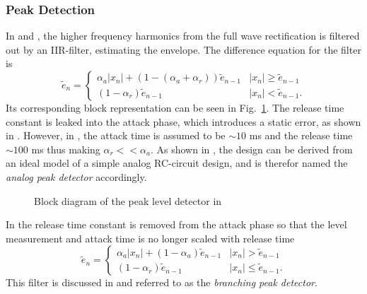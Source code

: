 \documentclass[../main2.tex]{subfiles}
\providecommand{\rootdir}{..}
\begin{document}
\subsubsection{Peak Detection}\label{peak_detection}
In \cite{mcnally1984dynamic} and \cite{zolzer1997digital}, the higher frequency harmonics from the full wave rectification is filtered out by an IIR-filter, estimating the envelope. The difference equation for the filter is
\begin{equation}\label{eq:analogue_det}
\tilde{e}_n = \begin{cases}
    \alpha_{a} |x_n| + (1- (\alpha_{a} + \alpha_{r})) \tilde{e}_{n-1}  	& |x_n| \geq \tilde{e}_{n-1} \\
    (1-\alpha_{r}) \tilde{e}_{n-1} 							& |x_n| < \tilde{e}_{n-1}.
\end{cases}
\end{equation}
Its corresponding block representation can be seen in Fig.~\ref{fig:block_mcnally_theory_peak}. The release time constant is leaked into the attack phase, which introduces a static error, as shown in \cite{reiss2012tutorial}. However, in \cite{mcnally1984dynamic}, the attack time is assumed to be $\sim 10$ ms and the release time   $\sim 100$ ms thus making $\alpha_r << \alpha_a$. As shown in \cite{reiss2012tutorial}, the design can be derived from an ideal model of a simple analog RC-circuit design, and is therefor named the \emph{analog peak detector} accordingly.
\begin{figure}
\centerline{}
\caption{Block diagram of the peak level detector in \cite{mcnally1984dynamic}}
\label{fig:block_mcnally_theory_peak}
\end{figure}

In \cite{zolzer2008digital} the release time constant is removed from the attack phase so that the level measurement and attack time is no longer scaled with release time
\begin{equation}
\tilde{e}_n = \begin{cases}
    \alpha_{a} |x_n| + (1-\alpha_{a}) \tilde{e}_{n-1} 	& |x_n| > \tilde{e}_{n-1} \\
    (1-\alpha_{r}) \tilde{e}_{n-1} 					& |x_n| \leq \tilde{e}_{n-1}.
\end{cases}
\end{equation}
This filter is discussed in \cite{reiss2012tutorial} and referred to as the \emph{branching peak detector}.
\end{document}
